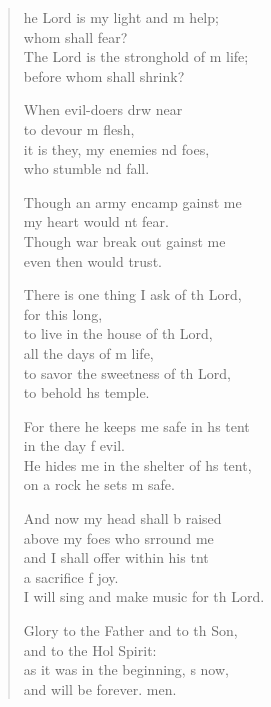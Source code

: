 \settowidth{\versewidth}{He hides me in the shelter of his tent, *}
\begin{verse}%
  \begin{patverse}
he Lord is my light and m help;\Med\\
whom shall  fear?\\
The Lord is the stronghold of m life;\Med\\
before whom shall  shrink?

When evil-doers drw near\Med\\
to devour m flesh,\\
it is they, my enemies nd foes,\Med\\
who stumble nd fall.

Though an army encamp gainst me\Med\\
my heart would nt fear.\\
Though war break out gainst me\Med\\
even then would  trust.

There is one thing I ask of th Lord,\Med\\
for this  long,\\
to live in the house of th Lord,\Med\\
all the days of m life,\\
to savor the sweetness of th Lord,\Med\\
to behold h\pointup{\i}s temple.

For there he keeps me safe in h\pointup{\i}s tent\Med\\
in the day f evil.\\
He hides me in the shelter of h\pointup{\i}s tent,\Med\\
on a rock he sets m safe.

And now my head shall b raised\Med\\
above my foes who srround me\\
and I shall offer within his tnt\Flex\\
a sacrifice f joy.\Med\\
I will sing and make music for th Lord.

Glory to the Father and to th Son,\Med\\
and to the Hol Spirit:\\
as it was in the beginning, \pointup{\i}s now,\Med\\
and will be forever. men.
  \end{patverse}
\end{verse}
